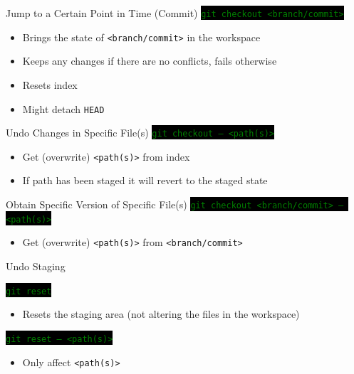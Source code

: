 \documentclass[
14pt,
aspectratio=169,
usenames,
dvipsnames,
x11names]{beamer}
\newcommand{\code}[1]{{\small\setlength{\fboxsep}{2pt}\colorbox{black}{\textcolor{green}{\texttt{#1}}}}}
\begin{document}

\begin{frame}{Jump to a Certain Point in Time (Commit)}
  \code{git checkout <branch/commit>}
  \begin{itemize}
  \item Brings the state of \texttt{<branch/commit>} in the workspace
  \item Keeps any changes if there are no conflicts, fails otherwise
  \item Resets index
  \item Might detach \texttt{HEAD}
  \end{itemize}
\end{frame}

\begin{frame}{Undo Changes in Specific File(s)}
  \code{git checkout -- <path(s)>}
  \begin{itemize}
  \item Get (overwrite) \texttt{<path(s)>} from \alert{index}
  \item If path has been \alert{staged} it will revert to the \alert{staged state}
  \end{itemize}
\end{frame}

\begin{frame}{Obtain Specific Version of Specific File(s)}
  \code{git checkout <branch/commit> -- <path(s)>}
  \begin{itemize}
  \item Get (overwrite) \texttt{<path(s)>} from \texttt{<branch/commit>}
  \end{itemize}
\end{frame}

\begin{frame}{Undo Staging}

  \code{git reset}
  \begin{itemize}
  \item Resets the staging area (not altering the files in the
    workspace)
  \end{itemize}
  \vfill
  \pause

  \code{git reset -- <path(s)>}
  \begin{itemize}
  \item Only affect \texttt{<path(s)>}
  \end{itemize}
\end{frame}
\end{document}
